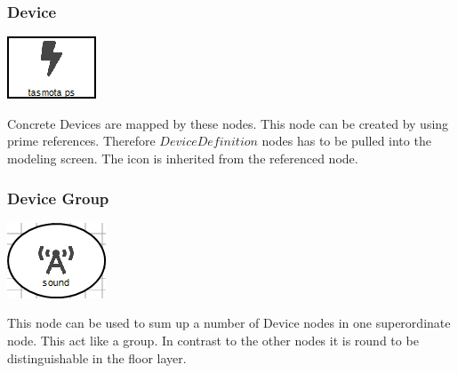 \subsubsection{Device}
\noindent\begin{minipage}{0.15\textwidth}%
	\includegraphics[width=\linewidth]{assets/images/sensor}
\end{minipage}%
\hfill%
\begin{minipage}{0.8\textwidth}
	Concrete Devices are mapped by these nodes. This node can be created by using prime references. Therefore $DeviceDefinition$ nodes has to be pulled into the modeling screen. The icon is inherited from the referenced node.
\end{minipage}

\subsubsection{Device Group}
\noindent\begin{minipage}{0.15\textwidth}%
	\includegraphics[width=\linewidth]{assets/images/group}
\end{minipage}%
\hfill%
\begin{minipage}{0.8\textwidth}
	This node can be used to sum up a number of Device nodes in one superordinate node. This act like a group. In contrast to the other nodes it is round to be distinguishable in the floor layer.
\end{minipage}

